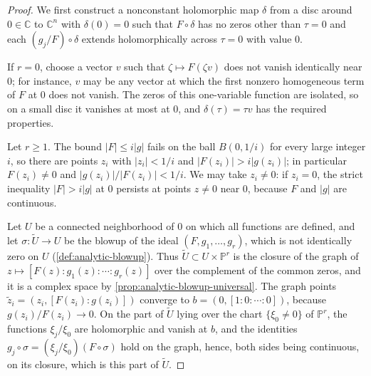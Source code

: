 \begin{proof}
We first construct a nonconstant holomorphic map $\delta$ from a disc around $0\in\mathbb C$ to $\mathbb C^n$ with $\delta(0)=0$ such that $F\circ\delta$ has no zeros other than $\tau=0$ and each $(g_j/F)\circ\delta$ extends holomorphically across $\tau=0$ with value $0$.

If $r=0$, choose a vector $v$ such that $\zeta\mapsto F(\zeta v)$ does not vanish identically near $0$; for instance, $v$ may be any vector at which the first nonzero homogeneous term of $F$ at $0$ does not vanish. The zeros of this one-variable function are isolated, so on a small disc it vanishes at most at $0$, and $\delta(\tau)=\tau v$ has the required properties.

Let $r\geq1$. The bound $|F|\leq i|g|$ fails on the ball $B(0,1/i)$ for every large integer $i$, so there are points $z_i$ with $|z_i|<1/i$ and $|F(z_i)|>i|g(z_i)|$; in particular $F(z_i)\neq0$ and $|g(z_i)|/|F(z_i)|<1/i$. We may take $z_i\neq0$: if $z_i=0$, the strict inequality $|F|>i|g|$ at $0$ persists at points $z\neq0$ near $0$, because $F$ and $|g|$ are continuous.

Let $U$ be a connected neighborhood of $0$ on which all functions are defined, and let $\sigma\colon\widetilde U\to U$ be the blowup of the ideal $(F,g_1,\ldots,g_r)$, which is not identically zero on $U$ (\cref{def:analytic-blowup}). Thus $\widetilde U\subset U\times\mathbb P^r$ is the closure of the graph of $z\mapsto[F(z):g_1(z):\cdots:g_r(z)]$ over the complement of the common zeros, and it is a complex space by \cref{prop:analytic-blowup-universal}. The graph points $\tilde z_i=(z_i,[F(z_i):g(z_i)])$ converge to $b=(0,[1:0:\cdots:0])$, because $g(z_i)/F(z_i)\to0$. On the part of $\widetilde U$ lying over the chart $\{\xi_0\neq0\}$ of $\mathbb P^r$, the functions $\xi_j/\xi_0$ are holomorphic and vanish at $b$, and the identities $g_j\circ\sigma=(\xi_j/\xi_0)(F\circ\sigma)$ hold on the graph, hence, both sides being continuous, on its closure, which is this part of $\widetilde U$.


\end{proof}
